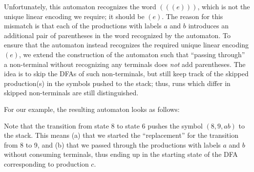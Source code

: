 \documentclass[acmsmall,review,anonymous]{acmart}\settopmatter{printfolios=true,printccs=false,printacmref=false}
\newcommand{\pospl}{(}
\newcommand{\pospr}{)}
\begin{document}
\noindent Unfortunately, this automaton recognizes the word $(((e)))$,
which is not the unique linear encoding we require; it should be
$(e)$. The reason for this mismatch is that each of the productions
with labels $a$ and $b$ introduces an additional pair of parentheses
in the word recognized by the automaton. To ensure that the automaton
instead recognizes the required unique linear encoding $(e)$, we
extend the construction of the automaton such that ``passing through''
a non-terminal without recognizing any terminals does \emph{not} add
parentheses. The idea is to skip the DFAs of such non-terminals, but
still keep track of the skipped production(s) in the symbols pushed to
the stack; thus, runs which differ in skipped non-terminals are still
distinguished.

For our example, the resulting automaton looks as follows:

\begin{center}
\end{center}

Note that the transition from state 8 to state 6 pushes the symbol
$(8, 9, ab)$ to the stack. This means (a) that we started the
``replacement'' for the transition from 8 to 9, and (b) that we passed
through the productions with labels $a$ and $b$ without consuming
terminals, thus ending up in the starting state of the DFA
corresponding to production $c$.
\end{document}
